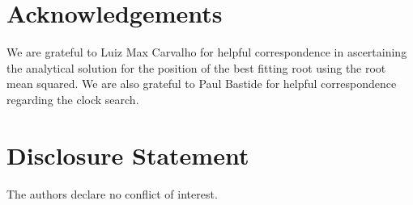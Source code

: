 \documentclass{article}
\begin{document}
\section*{Acknowledgements}
We are grateful to Luiz Max Carvalho for helpful correspondence in ascertaining the analytical solution for the position of the best fitting root using the root mean squared. We are also grateful to Paul Bastide for helpful correspondence regarding the clock search.

\section*{Disclosure Statement}
The authors declare no conflict of interest.


\end{document}
